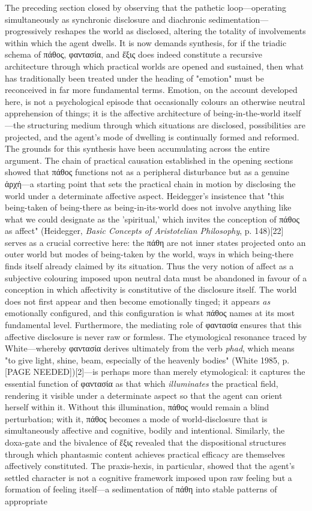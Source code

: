 \documentclass{article}
\begin{document}
The preceding section closed by observing that the pathetic loop—operating simultaneously as synchronic disclosure and diachronic sedimentation—progressively reshapes the world as disclosed, altering the totality of involvements within which the agent dwells. It is now demands synthesis, for if the triadic schema of πάθος, φαντασία, and ἕξις does indeed constitute a recursive architecture through which practical worlds are opened and sustained, then what has traditionally been treated under the heading of "emotion" must be reconceived in far more fundamental terms. Emotion, on the account developed here, is not a psychological episode that occasionally colours an otherwise neutral apprehension of things; it is the affective architecture of being-in-the-world itself—the structuring medium through which situations are disclosed, possibilities are projected, and the agent's mode of dwelling is continually formed and reformed. The grounds for this synthesis have been accumulating across the entire argument. The chain of practical causation established in the opening sections showed that πάθος functions not as a peripheral disturbance but as a genuine ἀρχή—a starting point that sets the practical chain in motion by disclosing the world under a determinate affective aspect. Heidegger's insistence that "this being-taken of being-there as being-in-its-world does not involve anything like what we could designate as the 'spiritual,' which invites the conception of πάθος as affect" (Heidegger, \textit{Basic Concepts of Aristotelian Philosophy}, p. 148)[22] serves as a crucial corrective here: the πάθη are not inner states projected onto an outer world but modes of being-taken by the world, ways in which being-there finds itself already claimed by its situation. Thus the very notion of affect as a subjective colouring imposed upon neutral data must be abandoned in favour of a conception in which affectivity is constitutive of the disclosure itself. The world does not first appear and then become emotionally tinged; it appears \textit{as} emotionally configured, and this configuration is what πάθος names at its most fundamental level. Furthermore, the mediating role of φαντασία ensures that this affective disclosure is never raw or formless. The etymological resonance traced by White—whereby φαντασία derives ultimately from the verb \textit{phad}, which means "to give light, shine, beam, especially of the heavenly bodies" (White 1985, p. [PAGE NEEDED])[2]—is perhaps more than merely etymological: it captures the essential function of φαντασία as that which \textit{illuminates} the practical field, rendering it visible under a determinate aspect so that the agent can orient herself within it. Without this illumination, πάθος would remain a blind perturbation; with it, πάθος becomes a mode of world-disclosure that is simultaneously affective and cognitive, bodily and intentional. Similarly, the doxa-gate and the bivalence of ἕξις revealed that the dispositional structures through which phantasmic content achieves practical efficacy are themselves affectively constituted. The praxis-hexis, in particular, showed that the agent's settled character is not a cognitive framework imposed upon raw feeling but a formation of feeling itself—a sedimentation of πάθη into stable patterns of appropriate 
\end{document}
